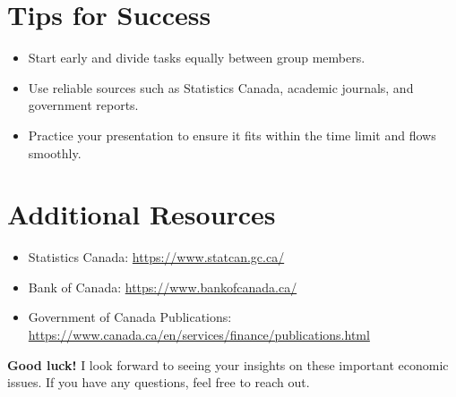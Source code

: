 \documentclass[12pt]{article}
\begin{document}
\section*{Tips for Success}
\begin{itemize}
    \item Start early and divide tasks equally between group members.
    \item Use reliable sources such as Statistics Canada, academic journals, and government reports.
    \item Practice your presentation to ensure it fits within the time limit and flows smoothly.

\end{itemize}

\section*{Additional Resources}
\begin{itemize}
    \item Statistics Canada: \url{https://www.statcan.gc.ca/}
    \item Bank of Canada: \url{https://www.bankofcanada.ca/}
    \item Government of Canada Publications: \url{https://www.canada.ca/en/services/finance/publications.html}
\end{itemize}

\vspace{2cm}
\centering
\textbf{Good luck!} I look forward to seeing your insights on these important economic issues. If you have any questions, feel free to reach out.
\end{document}
